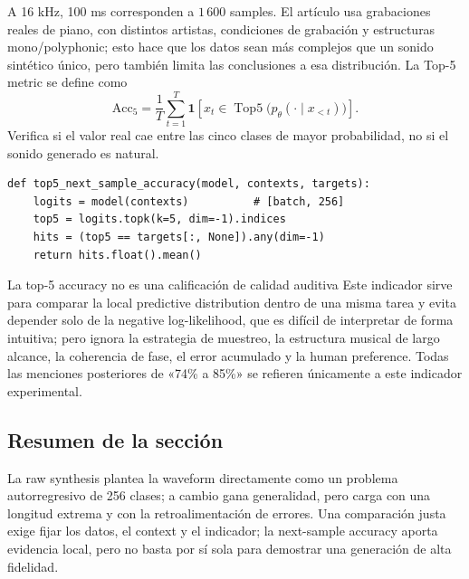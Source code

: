 

A 16 kHz, 100 ms corresponden a $1\,600$ samples. El artículo usa grabaciones reales de piano, con distintos artistas, condiciones de grabación y estructuras mono/polyphonic; esto hace que los datos sean más complejos que un sonido sintético único, pero también limita las conclusiones a esa distribución. La Top-5 metric se define como
\[
\mathrm{Acc}_{5}
=\frac{1}{T}\sum_{t=1}^{T}
\mathbf{1}\!\left[x_t\in\operatorname{Top5}\bigl(p_\theta(\cdot\mid x_{<t})\bigr)\right].
\]
Verifica si el valor real cae entre las cinco clases de mayor probabilidad, no si el sonido generado es natural.

\begin{lstlisting}[caption={Cálculo de la next-sample top-5 accuracy de una waveform cuantizada.}]
def top5_next_sample_accuracy(model, contexts, targets):
    logits = model(contexts)          # [batch, 256]
    top5 = logits.topk(k=5, dim=-1).indices
    hits = (top5 == targets[:, None]).any(dim=-1)
    return hits.float().mean()
\end{lstlisting}

\begin{warningbox}{La top-5 accuracy no es una calificación de calidad auditiva}
Este indicador sirve para comparar la local predictive distribution dentro de una misma tarea y evita depender solo de la negative log-likelihood, que es difícil de interpretar de forma intuitiva; pero ignora la estrategia de muestreo, la estructura musical de largo alcance, la coherencia de fase, el error acumulado y la human preference. Todas las menciones posteriores de «74\% a 85\%» se refieren únicamente a este indicador experimental.
\end{warningbox}

\subsection{Resumen de la sección}

La raw synthesis plantea la waveform directamente como un problema autorregresivo de 256 clases; a cambio gana generalidad, pero carga con una longitud extrema y con la retroalimentación de errores. Una comparación justa exige fijar los datos, el context y el indicador; la next-sample accuracy aporta evidencia local, pero no basta por sí sola para demostrar una generación de alta fidelidad.
